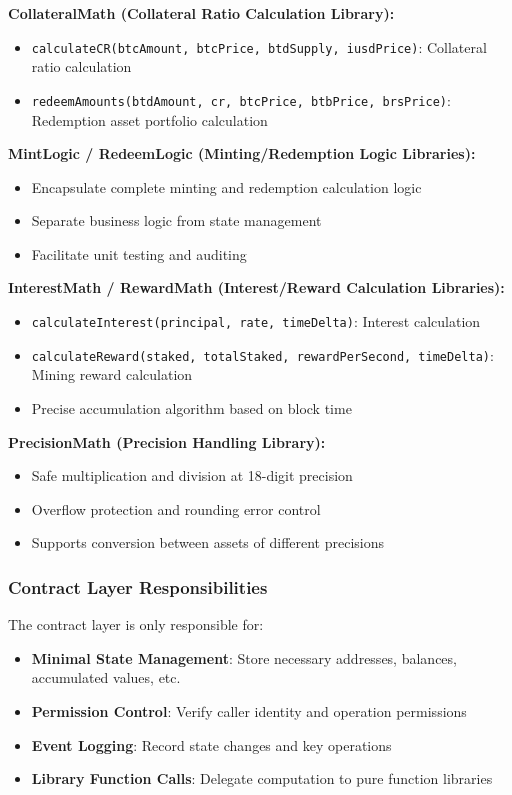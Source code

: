 \documentclass{article}
\begin{document}
\textbf{CollateralMath (Collateral Ratio Calculation Library):}
\begin{itemize}
  \item \texttt{calculateCR(btcAmount, btcPrice, btdSupply, iusdPrice)}: Collateral ratio calculation
  \item \texttt{redeemAmounts(btdAmount, cr, btcPrice, btbPrice, brsPrice)}: Redemption asset portfolio calculation
\end{itemize}

\textbf{MintLogic / RedeemLogic (Minting/Redemption Logic Libraries):}
\begin{itemize}
  \item Encapsulate complete minting and redemption calculation logic
  \item Separate business logic from state management
  \item Facilitate unit testing and auditing
\end{itemize}

\textbf{InterestMath / RewardMath (Interest/Reward Calculation Libraries):}
\begin{itemize}
  \item \texttt{calculateInterest(principal, rate, timeDelta)}: Interest calculation
  \item \texttt{calculateReward(staked, totalStaked, rewardPerSecond, timeDelta)}: Mining reward calculation
  \item Precise accumulation algorithm based on block time
\end{itemize}

\textbf{PrecisionMath (Precision Handling Library):}
\begin{itemize}
  \item Safe multiplication and division at 18-digit precision
  \item Overflow protection and rounding error control
  \item Supports conversion between assets of different precisions
\end{itemize}

\subsubsection{Contract Layer Responsibilities}
The contract layer is only responsible for:
\begin{itemize}
  \item \textbf{Minimal State Management}: Store necessary addresses, balances, accumulated values, etc.
  \item \textbf{Permission Control}: Verify caller identity and operation permissions
  \item \textbf{Event Logging}: Record state changes and key operations
  \item \textbf{Library Function Calls}: Delegate computation to pure function libraries
\end{itemize}
\end{document}
